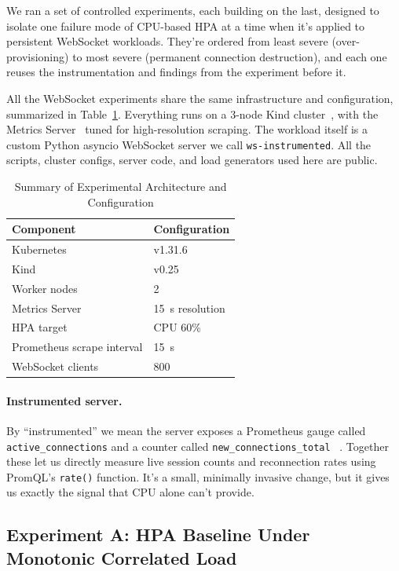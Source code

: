 \documentclass[twocolumn]{svjour3}
\begin{document}
We ran a set of controlled experiments, each building on the last, designed to
isolate one failure mode of CPU-based HPA at a time when it's applied to
persistent WebSocket workloads. They're ordered from least severe
(over-provisioning) to most severe (permanent connection destruction), and each one
reuses the instrumentation and findings from the experiment before it.

All the WebSocket experiments share the same infrastructure and configuration,
summarized in Table~\ref{tab:architecture}. Everything runs on a 3-node Kind
cluster~\cite{kind_docs,merkel2014docker}, with the Metrics
Server~\cite{k8s_metrics_server} tuned for high-resolution scraping. The workload
itself is a custom Python asyncio WebSocket server we call \texttt{ws-instrumented}.
All the scripts, cluster configs, server code, and load generators used here are
public.

\begin{table}[ht]
\centering
\caption{Summary of Experimental Architecture and Configuration}
\label{tab:architecture}
\begin{tabular}{@{}ll@{}}
\toprule
\textbf{Component} & \textbf{Configuration} \\
\midrule
Kubernetes & v1.31.6 \\
Kind & v0.25 \\
Worker nodes & 2 \\
Metrics Server & 15~s resolution \\
HPA target & CPU 60\% \\
Prometheus scrape interval & 15~s \\
WebSocket clients & 800 \\
\bottomrule
\end{tabular}
\end{table}

\paragraph{Instrumented server.}
By ``instrumented'' we mean the server exposes a Prometheus gauge called
\texttt{active\_connections} and a counter called \texttt{new\_connections\_total}
~\cite{prometheus_client_python,prometheus_docs}. Together these let us directly
measure live session counts and reconnection rates using PromQL's \texttt{rate()}
function. It's a small, minimally invasive change, but it gives us exactly the
signal that CPU alone can't provide.

\subsection{Experiment A: HPA Baseline Under Monotonic Correlated Load}
\end{document}

